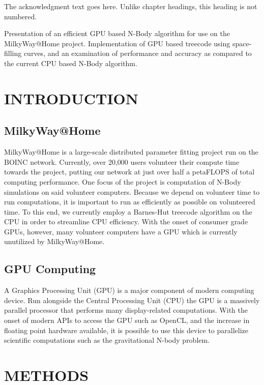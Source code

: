 \documentclass{thesis}
\author{Clayton Rayment}
\begin{document}
 
\titlepage             %
\tableofcontents       %
\listoftables          %
\listoffigures         %

The acknowledgment text goes here. Unlike chapter headings, 
this heading is not numbered.

Presentation of an efficient GPU based N-Body algorithm for use on the MilkyWay@Home project. Implementation of GPU based treecode using space-filling curves, and an examination of performance and accuracy as compared to the current CPU based N-Body algorithm.

\chapter{INTRODUCTION}
\section{MilkyWay@Home}
MilkyWay@Home is a large-scale distributed parameter fitting project run on the BOINC network. Currently, over 20,000 users volunteer their compute time towards the project, putting our network at just over half a petaFLOPS of total computing performance.  One focus of the project is computation of N-Body simulations on said volunteer computers. Because we depend on volunteer time to run computations, it is important to run as efficiently as possible on volunteered time. To this end, we currently employ a Barnes-Hut treecode algorithm on the CPU in order to streamline CPU efficiency. With the onset of consumer grade GPUs, however, many volunteer computers have a GPU which is currently unutilized by MilkyWay@Home.
\section{GPU Computing}
A Graphics Processing Unit (GPU) is a major component of modern computing device. Run alongside the Central Processing Unit (CPU) the GPU is a massively parallel processor that performs many display-related computations. With the onset of modern APIs to access the GPU such as OpenCL, and the increase in floating point hardware available, it is possible to use this device to parallelize scientific computations such as the gravitational N-body problem.

\chapter{METHODS}
\end{document}
